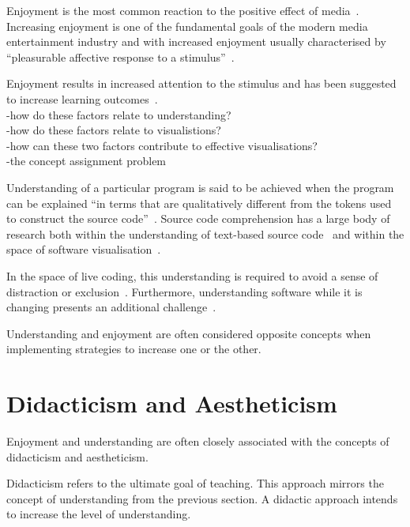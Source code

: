 Enjoyment is the most common reaction to the positive effect of media~\cite{Vorderer2004}. Increasing enjoyment is one of the fundamental goals of the modern media entertainment industry and with increased enjoyment usually characterised by ``pleasurable affective response to a stimulus''~\cite{Brock2004}. 

Enjoyment results in increased attention to the stimulus and has been suggested to increase learning outcomes~.\\
-how do these factors relate to understanding?\\
-how do these factors relate to visualistions?\\
-how can these two factors contribute to effective visualisations?\\
-the concept assignment problem~\cite{Biggerstaff1994}

Understanding of a particular program is said to be achieved when the program can be explained ``in terms that are qualitatively different from the tokens used to construct the source code''~\cite{Biggerstaff1994}. Source code comprehension has a large body of research both within the understanding of text-based source code~ and within the space of software visualisation~\cite{Hosking2005}.

In the space of live coding, this understanding is required to avoid a sense of distraction or exclusion~\cite{McLean2010a}. Furthermore, understanding software while it is changing presents an additional challenge~\cite{Eisenbarth2003}.

Understanding and enjoyment are often considered opposite concepts when implementing strategies to increase one or the other. 

\section{Didacticism and Aestheticism}

Enjoyment and understanding are often closely associated with the concepts of didacticism and aestheticism.

Didacticism refers to the ultimate goal of teaching. This approach mirrors the concept of understanding from the previous section. A didactic approach intends to increase the level of understanding.

